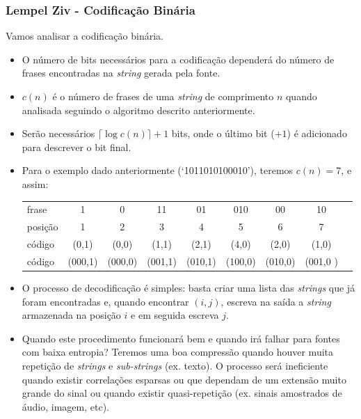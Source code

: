 \begin{frame}[allowframebreaks]
  \frametitle{Lempel Ziv - Codificação Binária}

  Vamos analisar a codificação binária.
  \begin{itemize}
  \item O número de bits necessários para a codificação dependerá do número de frases encontradas
	na \textit{string} gerada pela fonte.
  \item $c(n)$ é o número de frases de uma \textit{string} de comprimento $n$ quando analisada
	seguindo o algoritmo descrito anteriormente.
  \item Serão necessários $\lceil \log c(n) \rceil + 1$ bits, onde o último bit ($+1$) é adicionado 
	para descrever o bit final.
  \item Para o exemplo dado anteriormente (`1011010100010'), teremos $c(n)=7$, e assim:
	{ \scriptsize
        \begin{tabular}{lcccccccc} 
        frase   & 1       & 0       & 11      & 01      & 010     & 00      & 10    \\
        posição & 1       & 2       & 3       & 4       & 5       & 6       & 7     \\
        código  & (0,1)   & (0,0)   & (1,1)   & (2,1)   & (4,0)   & (2,0)   & (1,0) \\
	código  & (000,1) & (000,0) & (001,1) & (010,1) & (100,0) & (010,0) & (001,0 ) 
        \end{tabular}
	}
  \item O processo de decodificação é simples: basta criar uma lista das \textit{strings}
	que já foram encontradas e, quando encontrar $(i,j)$, escreva na saída a \textit{string}
	armazenada na posição $i$ e em seguida escreva $j$.
  \item Quando este procedimento funcionará bem e quando irá falhar para fontes com baixa entropia?
	Teremos uma boa compressão quando houver muita repetição de \textit{strings} e \textit{sub-strings} (ex. texto).
	O processo será ineficiente quando existir correlações esparsas ou que dependam de um extensão muito grande do sinal
	ou quando existir quasi-repetição (ex. sinais amostrados de áudio, imagem, etc).
  \end{itemize}
\end{frame}

